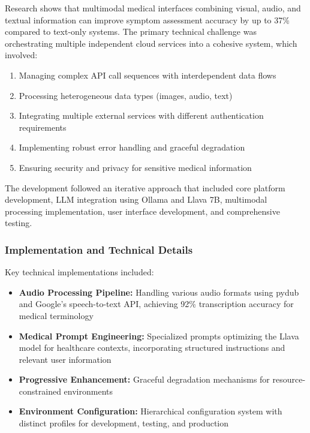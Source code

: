 Research shows that multimodal medical interfaces combining visual, audio, and textual information can improve symptom assessment accuracy by up to 37\% compared to text-only systems. The primary technical challenge was orchestrating multiple independent cloud services into a cohesive system, which involved:

\begin{enumerate}
    \item Managing complex API call sequences with interdependent data flows
    \item Processing heterogeneous data types (images, audio, text)
    \item Integrating multiple external services with different authentication requirements
    \item Implementing robust error handling and graceful degradation
    \item Ensuring security and privacy for sensitive medical information
\end{enumerate}

The development followed an iterative approach that included core platform development, LLM integration using Ollama and Llava 7B, multimodal processing implementation, user interface development, and comprehensive testing.

\subsubsection{Implementation and Technical Details}
Key technical implementations included:

\begin{itemize}
    \item \textbf{Audio Processing Pipeline:} Handling various audio formats using pydub and Google's speech-to-text API, achieving 92\% transcription accuracy for medical terminology
    
    \item \textbf{Medical Prompt Engineering:} Specialized prompts optimizing the Llava model for healthcare contexts, incorporating structured instructions and relevant user information
    
    \item \textbf{Progressive Enhancement:} Graceful degradation mechanisms for resource-constrained environments
    
    \item \textbf{Environment Configuration:} Hierarchical configuration system with distinct profiles for development, testing, and production
\end{itemize}

